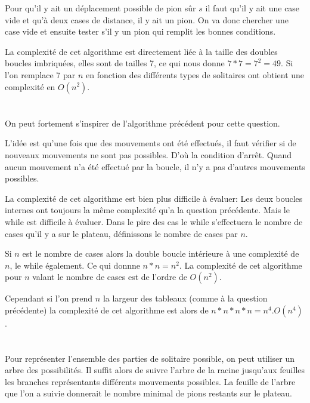 \documentclass[a4paper]{article}
\begin{document}
  Pour qu'il y ait un déplacement possible de pion sûr $s$ il faut qu'il y ait une case vide et qu'à deux cases de distance, il y ait un pion.
  On va donc chercher une case vide et ensuite tester s'il y un pion qui remplit les bonnes conditions.

  

  La complexité de cet algorithme est directement liée à la taille des doubles boucles imbriquées, elles sont de tailles 7, ce qui nous donne  $7*7 = 7^2=49$.
  Si l'on remplace 7 par $n$ en fonction des différents types de solitaires ont obtient une complexité en $O(n^2)$.

  \section{}

  On peut fortement s'inspirer de l'algorithme précédent pour cette question.

  

  L'idée est qu'une fois que des mouvements ont été effectués, il faut vérifier si de nouveaux mouvements ne sont pas possibles. D'où la condition d'arrêt. Quand aucun mouvement n'a été effectué par la boucle, il n'y a pas d'autres mouvements possibles.


  La complexité de cet algorithme est bien plus difficile à évaluer: Les deux boucles internes ont toujours la même complexité qu'a la question précédente. Mais le while est difficile à évaluer.
  Dans le pire des cas le while s'effectuera le nombre de cases qu'il y a sur le plateau, définissons le nombre de cases par $n$.

  Si $n$ est le nombre de cases alors la double boucle intérieure à une complexité de $n$, le while également. Ce qui donnne $n*n=n^2$.
  La complexité de cet algorithme pour $n$ valant le nombre de cases est de l'ordre de $O(n^2)$.

  Cependant si l'on prend $n$ la largeur des tableaux (comme à la question précédente) la complexité de cet algorithme est alors de $n*n*n*n = n^4. O(n^4)$.

  \section{}
  Pour représenter l'ensemble des parties de solitaire possible, on peut utiliser un arbre des possibilités.
  Il suffit alors de suivre l'arbre de la racine jusqu'aux feuilles les branches représentants différents mouvements possibles.
  La feuille de l'arbre que l'on a suivie donnerait le nombre minimal de pions restants sur le plateau.
\end{document}
